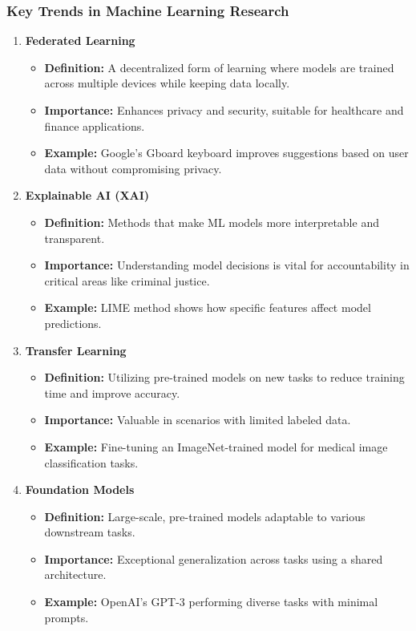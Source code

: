 \documentclass[aspectratio=169]{beamer}
\begin{document}
\begin{frame}[fragile]
    \frametitle{Key Trends in Machine Learning Research}
    \begin{enumerate}
        \item \textbf{Federated Learning}
            \begin{itemize}
                \item \textbf{Definition:} A decentralized form of learning where models are trained across multiple devices while keeping data locally.
                \item \textbf{Importance:} Enhances privacy and security, suitable for healthcare and finance applications.
                \item \textbf{Example:} Google's Gboard keyboard improves suggestions based on user data without compromising privacy.
            \end{itemize}
        
        \item \textbf{Explainable AI (XAI)}
            \begin{itemize}
                \item \textbf{Definition:} Methods that make ML models more interpretable and transparent.
                \item \textbf{Importance:} Understanding model decisions is vital for accountability in critical areas like criminal justice.
                \item \textbf{Example:} LIME method shows how specific features affect model predictions.
            \end{itemize}
        
        \item \textbf{Transfer Learning}
            \begin{itemize}
                \item \textbf{Definition:} Utilizing pre-trained models on new tasks to reduce training time and improve accuracy.
                \item \textbf{Importance:} Valuable in scenarios with limited labeled data.
                \item \textbf{Example:} Fine-tuning an ImageNet-trained model for medical image classification tasks.
            \end{itemize}
        
        \item \textbf{Foundation Models}
            \begin{itemize}
                \item \textbf{Definition:} Large-scale, pre-trained models adaptable to various downstream tasks.
                \item \textbf{Importance:} Exceptional generalization across tasks using a shared architecture.
                \item \textbf{Example:} OpenAI's GPT-3 performing diverse tasks with minimal prompts.
            \end{itemize}
    \end{enumerate}
\end{frame}
\end{document}
